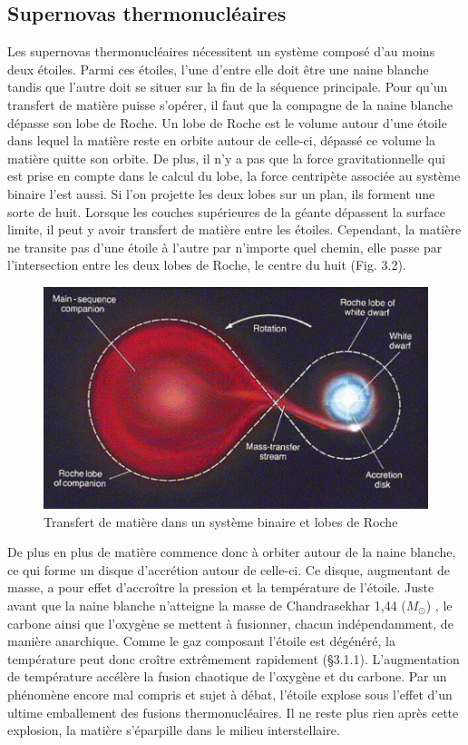 \subsection{Supernovas thermonucléaires}\medskip

Les supernovas thermonucléaires nécessitent un système composé d'au moins deux étoiles. Parmi ces étoiles, l'une d'entre elle doit être une naine blanche tandis que l'autre doit se situer sur la fin de la séquence principale. Pour qu'un transfert de matière puisse s'opérer, il faut que la compagne de la naine blanche dépasse son lobe de Roche. Un lobe de Roche est le volume autour d'une étoile dans lequel la matière reste en orbite autour de celle-ci, dépassé ce volume la matière quitte son orbite. De plus, il n'y a pas que la force gravitationnelle qui est prise en compte dans le calcul du lobe, la force centripète associée au système binaire l'est aussi. Si l'on projette les deux lobes sur un plan, ils forment une sorte de huit. Lorsque les couches supérieures de la géante dépassent la surface limite, il peut y avoir transfert de matière entre les étoiles. Cependant, la matière ne transite pas d'une étoile à l'autre par n'importe quel chemin, elle passe par l'intersection entre les deux lobes de Roche, le centre du huit (Fig. 3.2).\bigskip

\begin{figure}[H]
	\centering
	\includegraphics[scale=0.6]{images/lobederoche}
	\caption{Transfert de matière dans un système binaire et lobes de Roche}
\end{figure}\bigskip 

De plus en plus de matière commence donc à orbiter autour de la naine blanche, ce qui forme un disque d'accrétion autour de celle-ci. Ce disque, augmentant de masse, a pour effet d'accroître la pression et la température de l'étoile. Juste avant que la naine blanche n'atteigne la masse de Chandrasekhar 1,44 ($M_\odot$) %
 , le carbone ainsi que l'oxygène se mettent à fusionner, chacun indépendamment, de manière anarchique. Comme le gaz composant l'étoile est dégénéré, la température peut donc croître extrêmement rapidement (§3.1.1). L'augmentation de température accélère la fusion chaotique de l'oxygène et du carbone. Par un phénomène encore mal compris et sujet à débat, l'étoile explose sous l'effet d'un ultime emballement des fusions thermonucléaires. Il ne reste plus rien après cette explosion, la matière s'éparpille dans le milieu interstellaire. \smallskip
 
